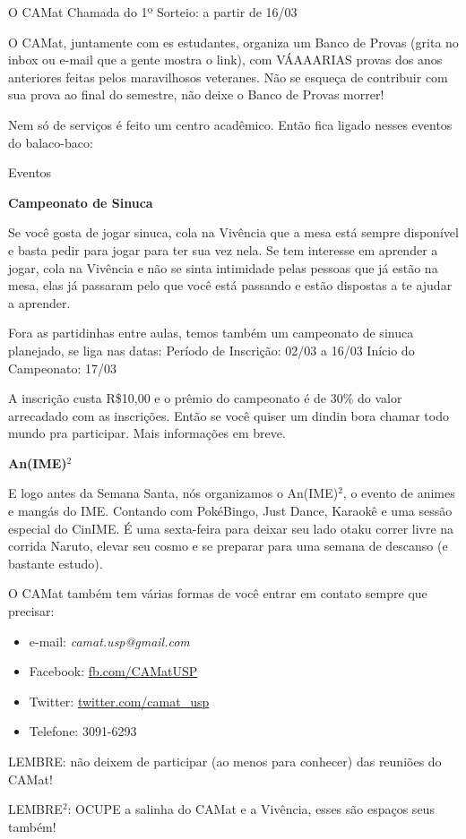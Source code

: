\begin{secao}{O CAMat}
Chamada do 1º Sorteio: a partir de 16/03

O CAMat, juntamente com es estudantes, organiza um Banco de Provas (grita no inbox ou e-mail que a gente mostra o link), com VÁAAARIAS provas dos anos anteriores feitas pelos maravilhosos veteranes. Não se esqueça de contribuir com sua prova ao final do semestre, não deixe o Banco de Provas morrer!
  
Nem só de serviços é feito um centro acadêmico. Então fica ligado nesses eventos do balaco-baco:

\begin{subsecao}{Eventos}

\textbf{Campeonato de Sinuca}

Se você gosta de jogar sinuca, cola na Vivência que a mesa está sempre disponível e basta pedir para jogar para ter sua vez nela. Se tem interesse em aprender a jogar, cola na Vivência e não se sinta intimidade pelas pessoas que já estão na mesa, elas já passaram pelo que você está passando e estão dispostas a te ajudar a aprender.

Fora as partidinhas entre aulas, temos também um campeonato de sinuca planejado, se liga nas datas: 
Período de Inscrição: 02/03 a 16/03
Início do Campeonato: 17/03

A inscrição custa R\$10,00 e o prêmio do campeonato é de 30\% do valor arrecadado com as inscrições. Então se você quiser um dindin bora chamar todo mundo pra participar. Mais informações em breve.


\textbf{An(IME)$^2$}

E logo antes da Semana Santa, nós organizamos o An(IME)$^2$, 
o evento de animes e mangás do IME. Contando 
com PokéBingo, Just Dance, Karaokê e uma sessão especial do CinIME. É uma sexta-feira para deixar seu lado otaku correr livre na corrida Naruto, elevar seu cosmo e se preparar para uma semana de descanso (e bastante estudo).


O CAMat também tem várias formas de você entrar em contato sempre que precisar:

\begin{itemize}
\item e-mail: \textit{camat.usp@gmail.com}
\item Facebook: \url{fb.com/CAMatUSP}
\item Twitter: \url{twitter.com/camat_usp}
\item Telefone: 3091-6293
\end{itemize}
LEMBRE: não deixem de participar (ao menos para conhecer) das reuniões do
CAMat!

LEMBRE$^2$: OCUPE a salinha do CAMat e a Vivência, esses são espaços seus também!

\end{subsecao}

\end{secao}
